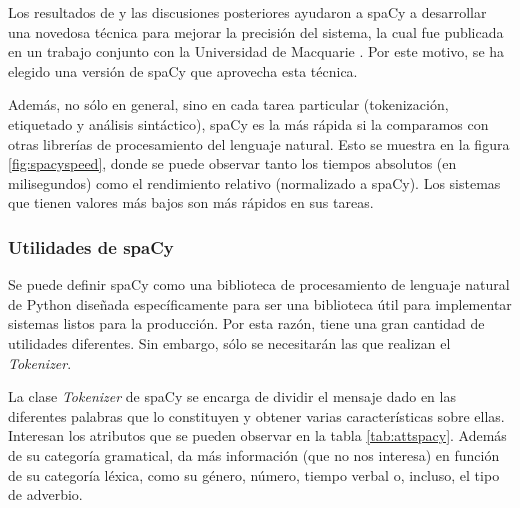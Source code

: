 Los resultados de \cite{choi2015depends} y las discusiones posteriores ayudaron a spaCy a desarrollar una novedosa técnica para mejorar la precisión del sistema, la cual fue publicada en un trabajo conjunto con la Universidad de Macquarie \citep{honnibal2015improved}. Por este motivo, se ha elegido una versión de spaCy que aprovecha esta técnica.

Además, no sólo en general, sino en cada tarea particular (tokenización, etiquetado y análisis sintáctico), spaCy es la más rápida si la comparamos con otras librerías de procesamiento del lenguaje natural. Esto se muestra en la figura \ref{fig:spacyspeed}, donde se puede observar tanto los tiempos absolutos (en milisegundos) como el rendimiento relativo (normalizado a spaCy). Los sistemas que tienen valores más bajos son más rápidos en sus tareas.

\subsubsection{Utilidades de spaCy}\label{ssect:spacyut}
Se puede definir spaCy como una biblioteca de procesamiento de lenguaje natural de Python diseñada específicamente para ser una biblioteca útil para implementar sistemas listos para la producción. Por esta razón, tiene una gran cantidad de utilidades diferentes. Sin embargo, sólo se necesitarán las que realizan el \textit{Tokenizer}.

La clase \textit{Tokenizer} de spaCy se encarga de dividir el mensaje dado en las diferentes palabras que lo constituyen y obtener varias características sobre ellas. Interesan los atributos que se pueden observar en la tabla \ref{tab:attspacy}. Además de su categoría gramatical, da más información (que no nos interesa) en función de su categoría léxica, como su género, número, tiempo verbal o, incluso, el tipo de adverbio.

